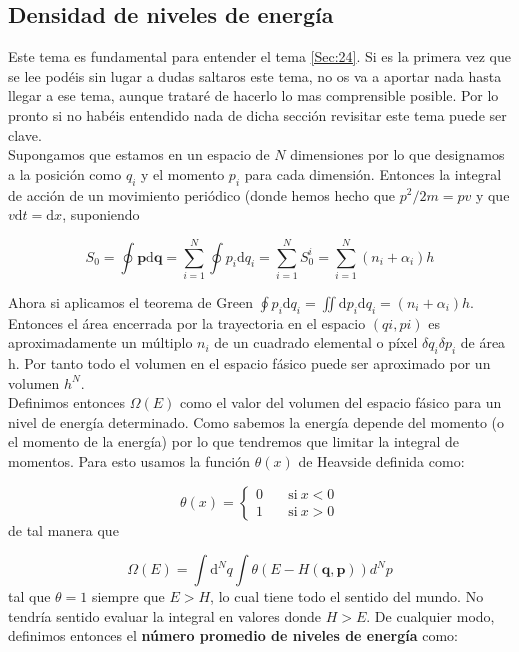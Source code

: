 \documentclass[12pt]{article}
\newcommand{\D}{\mathrm{d}}
\newcommand{\pn}{\mathbf{p}}
\newcommand{\qn}{\mathbf{q}}
\begin{document}
\subsection{Densidad de niveles de energía}

Este tema es fundamental para entender el tema \ref{Sec:24}. Si es la primera vez que se lee podéis sin lugar a dudas saltaros este tema, no os va a aportar nada hasta llegar a ese tema, aunque trataré de hacerlo lo mas comprensible posible. Por lo pronto si no habéis entendido nada de dicha sección revisitar este tema puede ser clave. \\

Supongamos que estamos en un espacio de $N$ dimensiones por lo que designamos a la posición como $q_i$ y el momento $p_i$ para cada dimensión. Entonces la integral de acción de un movimiento periódico  (donde hemos hecho que $p^2 /2m = p v$ y que $v \D t = \D x$, suponiendo 

$$ S_0 = \oint  \pn \D \qn = \sum_{i=1}^N \oint p_i \D q_i = \sum_{i=1}^N S_0^i = \sum_{i=1}^N (n_i + \alpha_i) h $$

Ahora si aplicamos el teorema de Green $\oint p_i \D q_i = \iint \D p_i \D q_i = (n_i + \alpha_i) h$. Entonces el área encerrada por la trayectoria en el espacio $(qi, pi)$ es aproximadamente un múltiplo $n_i$ de un cuadrado elemental o píxel $\delta q_i \delta p_i$ de área h. Por tanto todo el volumen en el espacio fásico puede ser aproximado por un volumen $h^N$.  \\

Definimos entonces $\Omega (E)$ como el valor del volumen del espacio fásico para un nivel de energía determinado. Como sabemos la energía depende del momento (o el momento de la energía) por lo que tendremos que limitar la integral de momentos. Para esto usamos la función $\theta(x)$ de Heavside definida como:

\begin{equation}
\theta (x) = \left\lbrace \begin{array}{ll}
0 & \quad \mathrm{si} \ x<0 \\
1 & \quad \mathrm{si} \ x>0 
\end{array} \right.
\end{equation}
de tal manera que

\begin{equation}
\Omega (E) = \int \D^N q \int \theta (E-H(\qn,\pn)) d^N p
\end{equation}
tal que $\theta = 1$ siempre que $E>H$, lo cual tiene todo el sentido del mundo. No tendría sentido evaluar la integral en valores donde $H>E$. De cualquier modo, definimos entonces el \textbf{número promedio de niveles de energía} como:
\end{document}

